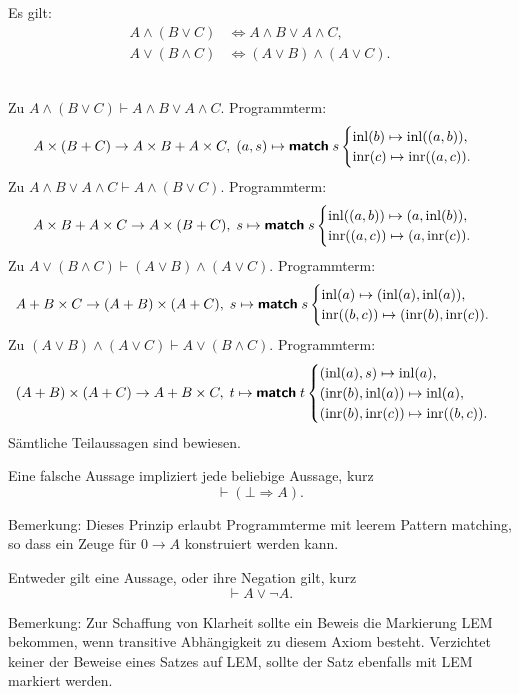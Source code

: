 \begin{Satz}%
\label{bool-dl}
Es gilt:
\begin{align*}
A\land (B\lor C) &\iff A\land B\lor A\land C,\\
A\lor (B\land C) &\iff (A\lor B)\land (A\lor C).
\end{align*}
\end{Satz}
\\
Zu $A\land (B\lor C) \vdash A\land B\lor A\land C$.
Programmterm:
\[A\times (B+C) \to A\times B + A\times C,\; (a, s)\mapsto \text{{\normalfont\sffamily\bfseries match}}\; s \begin{cases}
\operatorname{inl}(b)\mapsto \operatorname{inl}((a,b)),\\
\operatorname{inr}(c)\mapsto \operatorname{inr}((a,c)).
\end{cases}\]
Zu $A\land B\lor A\land C\vdash A\land (B\lor C)$.
Programmterm:
\[A\times B + A\times C\to A\times (B + C),\;
s\mapsto\text{{\normalfont\sffamily\bfseries match}}\; s\begin{cases}
\operatorname{inl}((a,b))\mapsto (a, \operatorname{inl}(b)),\\
\operatorname{inr}((a,c))\mapsto (a, \operatorname{inr}(c)).
\end{cases}
\]
Zu $A\lor (B\land C) \vdash (A\lor B)\land (A\lor C)$. Programmterm:
\[A+B\times C\to (A+B)\times (A+C),\;
s\mapsto\text{{\normalfont\sffamily\bfseries match}}\; s\begin{cases}
\operatorname{inl}(a)\mapsto (\operatorname{inl}(a),\operatorname{inl}(a)),\\
\operatorname{inr}((b,c))\mapsto (\operatorname{inr}(b),\operatorname{inr}(c)).
\end{cases} 
\]
Zu $(A\lor B)\land (A\lor C)\vdash A\lor (B\land C)$. Programmterm:
\[
(A+B)\times (A+C)\to A + B\times C,\;
t\mapsto\text{{\normalfont\sffamily\bfseries match}}\; t\begin{cases}
(\operatorname{inl}(a), s) \mapsto\operatorname{inl}(a),\\
(\operatorname{inr}(b), \operatorname{inl}(a)) \mapsto\operatorname{inl}(a),\\
(\operatorname{inr}(b), \operatorname{inr}(c)) \mapsto\operatorname{inr}((b, c)).
\end{cases}
\]
Sämtliche Teilaussagen sind bewiesen.\;\qedsymbol

\begin{Axiom}\label{PE}
Eine falsche Aussage impliziert jede beliebige Aussage, kurz
\[\vdash (\bot\Rightarrow A).\]
\end{Axiom}
Bemerkung: Dieses Prinzip erlaubt Programmterme mit leerem
Pattern matching, so dass ein Zeuge für $0\to A$ konstruiert
werden kann.

\begin{Axiom}\label{LEM}\newlinefirst
Entweder gilt eine Aussage, oder ihre Negation gilt, kurz
\[\vdash A\lor\neg A.\]
\end{Axiom}
Bemerkung: Zur Schaffung von Klarheit sollte ein Beweis die Markierung
LEM bekommen, wenn transitive Abhängigkeit zu diesem Axiom besteht.
Verzichtet keiner der Beweise eines Satzes auf LEM, sollte der Satz
ebenfalls mit LEM markiert werden.

